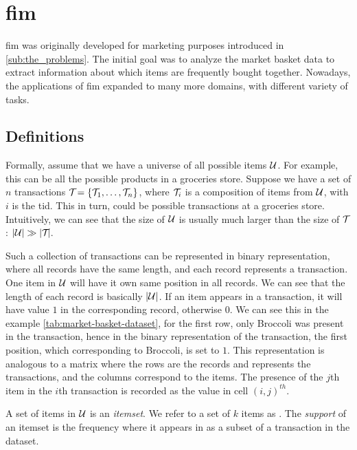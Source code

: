 \section{\Acl{fim}}
\label{sec:fim}
\Acl{fim} was originally developed for marketing purposes introduced in \autoref{sub:the_problems}.
The initial goal was to analyze the market basket data to extract information about which items are frequently bought together.
Nowadays, the applications of \acl{fim} expanded to many more domains, with different variety of tasks.

\subsection{Definitions}
Formally, assume that we have a universe of all possible items $\mathcal{U}$.
For example, this can be all the possible products in a groceries store.
Suppose we have a set of $\mathit{n}$ transactions $\mathcal{T}_{} = \{\mathcal{T}_{1}, \dots, \mathcal{T}_{n}\}{}$, where $\mathcal{T}_{i}$ is a composition of items from $\mathcal{U}$, with $i$ is the \ac{tid}.
This in turn, could be possible transactions at a groceries store.
Intuitively, we can see that the size of $\mathcal{U}$ is usually much larger than the size of $\mathcal{T}_{}$: $|\mathcal{U}| \gg |\mathcal{T}_{} |$.

Such a collection of transactions can be represented in binary representation, where all records have the same length, and each record represents a transaction.
One item in $\mathcal{U}$ will have it own same position in all records.
We can see that the length of each record is basically $|\mathcal{U}|$.
If an item appears in a transaction, it will have value $1$ in the corresponding record, otherwise $0$.
We can see this in the example \autoref{tab:market-basket-dataset}, for the first row, only Broccoli was present in the transaction, hence in the binary representation of the transaction, the first position, which corresponding to Broccoli, is set to $1$.
This representation is analogous to a matrix where the rows are the records and represents the transactions, and the columns correspond to the items.
The presence of the $\mathit{j}$th item in the $\mathit{i}$th transaction is recorded as the value in cell $\mathit{(i, j)}^{th}$.

A set of items in $\mathcal{U}$ is an \textit{itemset}.
We refer to a set of $k$ items as \kItemset.
The \textit{support} of an itemset is the frequency where it appears in as a subset of a transaction in the dataset.

